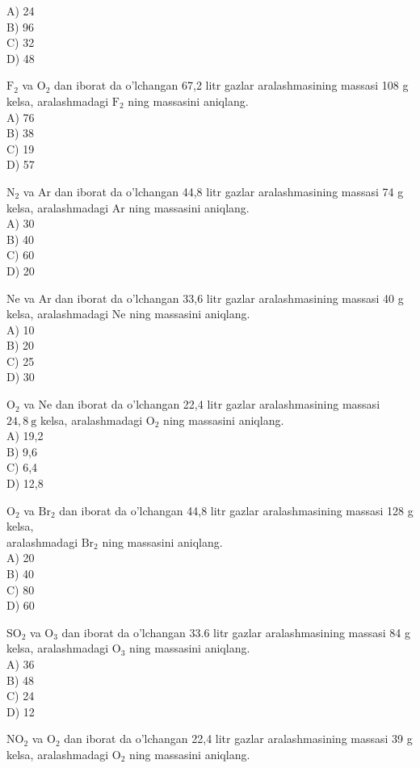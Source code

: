 A) 24\\
B) 96\\
C) 32\\
D) 48
  \item $\mathrm{F}_{2}$ va $\mathrm{O}_{2}$ dan iborat da o'lchangan 67,2 litr gazlar aralashmasining massasi 108 g kelsa, aralashmadagi $\mathrm{F}_{2}$ ning massasini aniqlang.\\
A) 76\\
B) 38\\
C) 19\\
D) 57
  \item $\mathrm{N}_{2}$ va Ar dan iborat da o'lchangan 44,8 litr gazlar aralashmasining massasi 74 g kelsa, aralashmadagi Ar ning massasini aniqlang.\\
A) 30\\
B) 40\\
C) 60\\
D) 20
  \item Ne va Ar dan iborat da o'lchangan 33,6 litr gazlar aralashmasining massasi 40 g kelsa, aralashmadagi Ne ning massasini aniqlang.\\
A) 10\\
B) 20\\
C) 25\\
D) 30
  \item $\mathrm{O}_{2}$ va Ne dan iborat da o'lchangan 22,4 litr gazlar aralashmasining massasi $24,8 \mathrm{~g}$ kelsa, aralashmadagi $\mathrm{O}_{2}$ ning massasini aniqlang.\\
A) 19,2\\
B) 9,6\\
C) 6,4\\
D) 12,8
  \item $\mathrm{O}_{2}$ va $\mathrm{Br}_{2}$ dan iborat da o'lchangan 44,8 litr gazlar aralashmasining massasi 128 g kelsa,\\
aralashmadagi $\mathrm{Br}_{2}$ ning massasini aniqlang.\\
A) 20\\
B) 40\\
C) 80\\
D) 60
  \item $\mathrm{SO}_{2}$ va $\mathrm{O}_{3}$ dan iborat da o'lchangan 33.6 litr gazlar aralashmasining massasi 84 g kelsa, aralashmadagi $\mathrm{O}_{3}$ ning massasini aniqlang.\\
A) 36\\
B) 48\\
C) 24\\
D) 12
  \item $\mathrm{NO}_{2}$ va $\mathrm{O}_{2}$ dan iborat da o'lchangan 22,4 litr gazlar aralashmasining massasi 39 g kelsa, aralashmadagi $\mathrm{O}_{2}$ ning massasini aniqlang.\\
